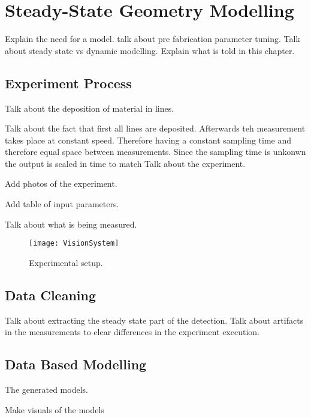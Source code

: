 
\chapter{Steady-State Geometry Modelling}\label{ch:modelling} 

Explain the need for a model. talk about pre fabrication parameter tuning. Talk about steady state vs dynamic modelling. Explain what is told in this chapter.

\blindtext[1]

\section{Experiment Process}

Talk about the deposition of material in lines. 

Talk about the fact that first all lines are deposited. Afterwards teh measurement takes place at constant speed. Therefore having a constant sampling time and therefore equal space between measurements. Since the sampling time is unkonwn the output is scaled in time to match 
Talk about the experiment. 

Add photos of the experiment.

Add table of input parameters. 

Talk about what is being measured.

\begin{figure}[ht]
\centering
\texttt{[image: VisionSystem]} 
\caption{Experimental setup.}
\label{fig: setup}
\end{figure}

\blindtext[3]

\section{Data Cleaning}

Talk about extracting the steady state part of the detection. Talk about artifacts in the measurements to clear differences in the experiment execution.

\blindtext[6]

\section{Data Based Modelling}

The generated models. 

Make visuals of the models

\blindtext[8]